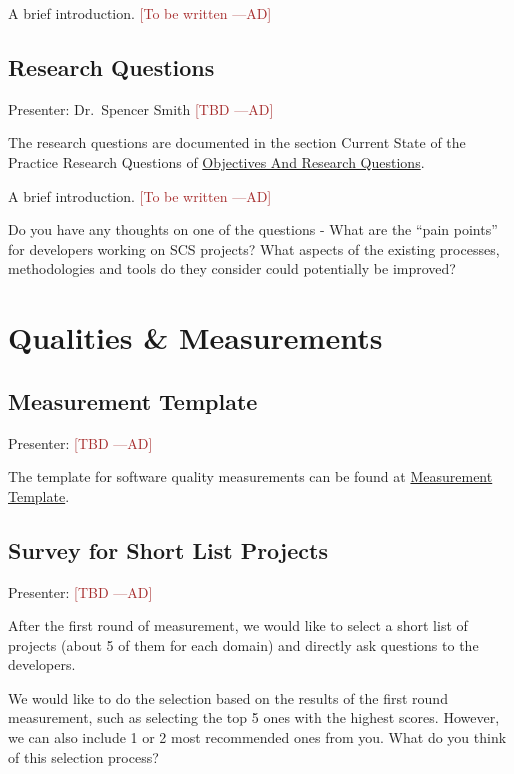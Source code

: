 \documentclass[12pt]{article}
\newcommand{\authornote}[3]{\textcolor{#1}{[#3 ---#2]}}
\newcommand{\authornote}[3]{}
\newcommand{\ad}[1]{\authornote{brown}{AD}{#1}} %
\begin{document}
A brief introduction. \ad{To be written}

\subsection{Research Questions}
\label{research_questions}
Presenter: Dr.\ Spencer Smith \ad{TBD}

The research questions are documented in the section Current State of the
Practice Research Questions of
\href{https://github.com/smiths/AIMSS/blob/master/OverallResearchProposal/ObjectivesAndResearchQuestions.pdf}{Objectives
And Research Questions}.

A brief introduction. \ad{To be written}

Do you have any thoughts on one of the questions - What are the ``pain points''
for developers working on SCS projects? What aspects of the existing processes,
methodologies and tools do they consider could potentially be improved?

\section{Qualities \& Measurements}

\subsection{Measurement Template}
\label{measurement_template}
Presenter: \ad{TBD}

The template for software quality measurements can be found at
\href{https://github.com/smiths/AIMSS/blob/master/StateOfPractice/Combined_MeasurementTemplate_EmpiricalMeasures.xlsx}{Measurement
	Template}.

\subsection{Survey for Short List Projects}
\label{survey_short_list_projects}
Presenter: \ad{TBD}

After the first round of measurement, we would like to select a short list of
projects (about 5 of them for each domain) and directly ask questions to the
developers.

We would like to do the selection based on the results of the first round
measurement, such as selecting the top 5 ones with the highest scores. However, we
can also include 1 or 2 most recommended ones from you. What do you think of
this selection process?
\end{document}

